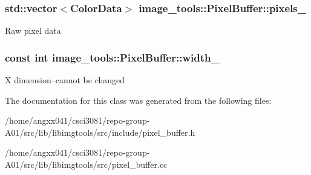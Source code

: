 \subsubsection[{\texorpdfstring{pixels\+\_\+}{pixels_}}]{\setlength{\rightskip}{0pt plus 5cm}std\+::vector$<${\bf Color\+Data}$>$ image\+\_\+tools\+::\+Pixel\+Buffer\+::pixels\+\_\+\hspace{0.3cm}{\ttfamily [private]}}\hypertarget{classimage__tools_1_1PixelBuffer_a0c52483e7e29f111acf98474105f2409}{}\label{classimage__tools_1_1PixelBuffer_a0c52483e7e29f111acf98474105f2409}
Raw pixel data 
\subsubsection[{\texorpdfstring{width\+\_\+}{width_}}]{\setlength{\rightskip}{0pt plus 5cm}const int image\+\_\+tools\+::\+Pixel\+Buffer\+::width\+\_\+\hspace{0.3cm}{\ttfamily [private]}}\hypertarget{classimage__tools_1_1PixelBuffer_ac67206a6b428c7b33bd7f90f65b8c171}{}\label{classimage__tools_1_1PixelBuffer_ac67206a6b428c7b33bd7f90f65b8c171}
X dimension--cannot be changed 

The documentation for this class was generated from the following files\+:\begin{DoxyCompactItemize}
\item 
/home/angxx041/csci3081/repo-\/group-\/\+A01/src/lib/libimgtools/src/include/pixel\+\_\+buffer.\+h\item 
/home/angxx041/csci3081/repo-\/group-\/\+A01/src/lib/libimgtools/src/pixel\+\_\+buffer.\+cc\end{DoxyCompactItemize}
